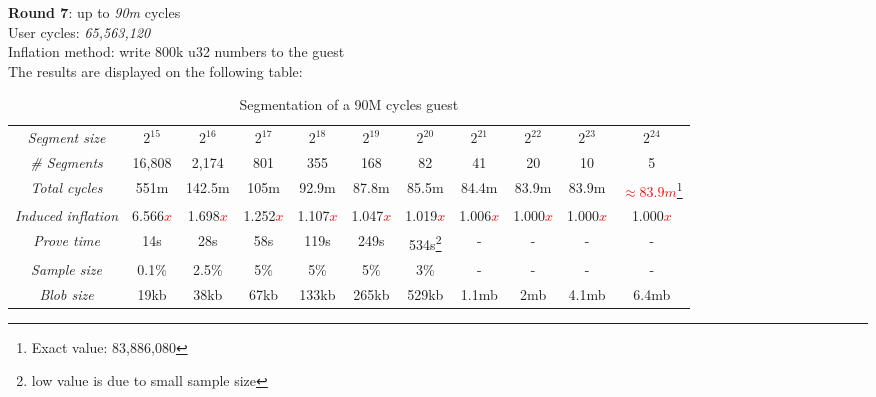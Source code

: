 \documentclass[a4paper, 10pt]{article}
\begin{document}
\par \noindent
\textbf{Round 7}: up to \textit{90m} cycles\\
User cycles: \textit{65,563,120}\\
Inflation method: write 800k u32 numbers to the guest\\
The results are displayed on the following table:
\begin{table}[H]
  	\begin{center}
    \label{tab:table8}
    \begin{minipage}{\textwidth}
    \begin{adjustbox}{width=\textwidth}
    \begin{tabular}{c|c|c|c|c|c|c|c|c|c|c}
	  \textit{Segment size} & $2^{15}$ & $2^{16}$ & $2^{17}$ & $2^{18}$ & $2^{19}$ & $2^{20}$ & $2^{21}$ & $2^{22}$ & $2^{23}$ & $2^{24}$\\
	  \textit{\# Segments} & 16,808 & 2,174 & 801 & 355 & 168 & 82 & 41 & 20 & 10 & 5\\
	  \textit{Total cycles} & 551m & 142.5m & 105m & 92.9m & 87.8m & 85.5m & 84.4m & 83.9m & 83.9m & \textcolor{red}{$\approx 83.9m$}\footnote{Exact value: 83,886,080}\\
	  \textit{Induced inflation} & 6.566\textcolor{red}{$x$} & 1.698\textcolor{red}{$x$} & 1.252\textcolor{red}{$x$} & 1.107\textcolor{red}{$x$} & 1.047\textcolor{red}{$x$} & 1.019\textcolor{red}{$x$} & 1.006\textcolor{red}{$x$} & 1.000\textcolor{red}{$x$} & 1.000\textcolor{red}{$x$} & 1.000\textcolor{red}{$x$}\\
	  \textit{Prove time} & 14s & 28s & 58s & 119s & 249s & 534s\footnote{low value is due to small sample size} & - & - & - & -\\
	  \textit{Sample size} & 0.1\% & 2.5\% & 5\% & 5\% & 5\% & 3\% & - & - & - & -\\
	  \textit{Blob size} & 19kb & 38kb & 67kb & 133kb & 265kb & 529kb & 1.1mb & 2mb & 4.1mb & 6.4mb\\
   	\end{tabular}
   	\end{adjustbox}
   	\end{minipage}
    \caption{Segmentation of a 90M cycles guest}
  \end{center}
\end{table}
\end{document}
